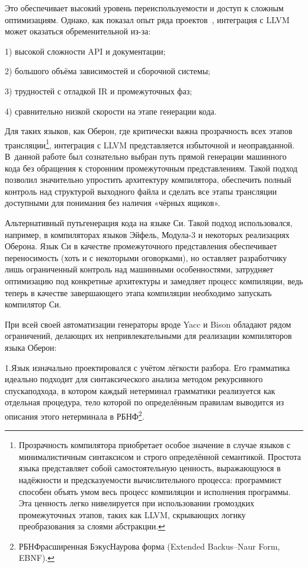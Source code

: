 \documentclass[utf8]{lgu}
\newcommand{\tire}{\unskip\nobreak\thinspace\textemdash\thinspace}
\begin{document}
Это обеспечивает высокий уровень переиспользуемости и доступ к сложным оптимизациям. Однако, как показал опыт ряда проектов~\cite{LLVMBugs}, интеграция с LLVM может оказаться обременительной из-за:

1) высокой сложности API и документации;

2) большого объёма зависимостей и сборочной системы;

3) трудностей с отладкой IR и промежуточных фаз;

4) сравнительно низкой скорости на этапе генерации кода.

Для таких языков, как Оберон, где критически важна прозрачность всех этапов трансляции\footnote{Прозрачность компилятора приобретает особое значение в случае языков с минималистичным синтаксисом и строго определённой семантикой. Простота языка представляет собой самостоятельную ценность, выражающуюся в надёжности и предсказуемости вычислительного процесса: программист способен объять умом весь процесс компиляции и исполнения программы. Эта ценность легко нивелируется при использовании громоздких промежуточных этапов, таких как LLVM, скрывающих логику преобразования за слоями абстракции.}, интеграция с LLVM представляется избыточной и неоправданной. В~данной работе был сознательно выбран путь прямой генерации машинного кода без обращения к сторонним промежуточным представлениям. Такой подход позволил значительно упростить архитектуру компилятора, обеспечить полный контроль над структурой выходного файла и сделать все этапы трансляции доступными для понимания без наличия «чёрных ящиков».

Альтернативный путь\tire генерация кода на языке Си. Такой подход использовался, например, в компиляторах языков Эйфель, Модула-3 и некоторых реализациях Оберона. Язык Си в качестве промежуточного представления обеспечивает переносимость (хоть и с некоторыми оговорками), но оставляет разработчику лишь ограниченный контроль над машинными особенностями, затрудняет оптимизацию под конкретные архитектуры и замедляет процесс компиляции, ведь теперь в качестве завершающего этапа компиляции необходимо запускать компилятор Си.

При всей своей автоматизации генераторы вроде Yacc и Bison обладают рядом ограничений, делающих их непривлекательными для реализации компиляторов языка Оберон:

1.\hspace{0.5em}Язык изначально проектировался с учётом лёгкости разбора. Его грамматика идеально подходит для синтаксического анализа методом рекурсивного спуска\tire подхода, в котором каждый нетерминал грамматики реализуется как отдельная процедура, тело которой по определённым правилам выводится из описания этого нетерминала в РБНФ\footnote{РБНФ\tire расширенная Бэкус\tire Наурова форма (Extended Backus–Naur Form, EBNF).}.
\end{document}

